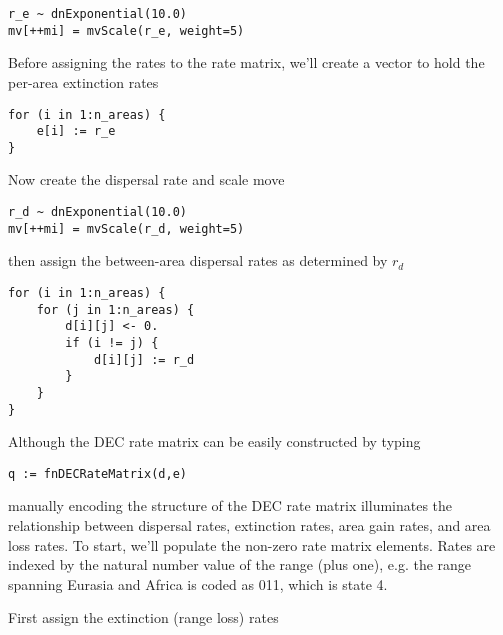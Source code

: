 \begin{snugshade}
\begin{lstlisting}
r_e ~ dnExponential(10.0)
mv[++mi] = mvScale(r_e, weight=5)
\end{lstlisting}
\end{snugshade}

Before assigning the rates to the rate matrix, we'll create a vector to hold the per-area extinction rates 

\begin{snugshade}
\begin{lstlisting}
for (i in 1:n_areas) {
    e[i] := r_e
}
\end{lstlisting}
\end{snugshade}

Now create the dispersal rate and scale move

\begin{snugshade}
\begin{lstlisting}
r_d ~ dnExponential(10.0)
mv[++mi] = mvScale(r_d, weight=5)
\end{lstlisting}
\end{snugshade}

then assign the between-area dispersal rates as determined by {\tt $r_d$}

\begin{snugshade}
\begin{lstlisting}
for (i in 1:n_areas) {
    for (j in 1:n_areas) {
    	d[i][j] <- 0.
        if (i != j) {
            d[i][j] := r_d
        }
    }
}
\end{lstlisting}
\end{snugshade}

Although the DEC rate matrix can be easily constructed by typing

\begin{snugshade}
\begin{lstlisting}
q := fnDECRateMatrix(d,e)
\end{lstlisting}
\end{snugshade}

manually encoding the structure of the DEC rate matrix illuminates the relationship between dispersal rates, extinction rates, area gain rates, and area loss rates.
To start, we'll populate the non-zero rate matrix elements.
Rates are indexed by the natural number value of the range (plus one), e.g. the range spanning Eurasia and Africa is coded as 011, which is state 4.

First assign the extinction (range loss) rates

